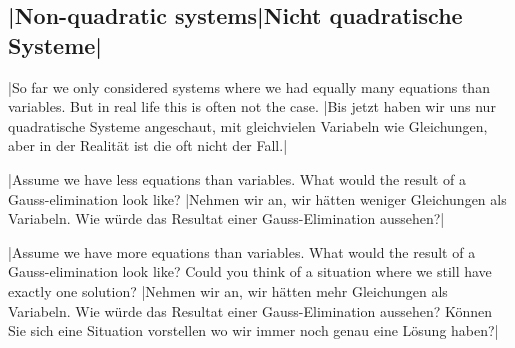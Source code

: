 \begin{exer}
\begin{itemize}
\end{itemize}
\end{exer}




\newpage

\subsection{\tr|Non-quadratic systems|Nicht quadratische Systeme|}
\tr|So far we only considered systems where we had equally many equations than variables. But in real life this is often not the case.
   |Bis jetzt haben wir uns nur quadratische Systeme angeschaut, mit gleichvielen Variabeln wie Gleichungen, aber in der Realität ist die oft nicht der Fall.|  
\begin{exer}
 \tr|Assume we have less equations than variables. What would the result of a Gauss-elimination look like?
    |Nehmen wir an, wir hätten weniger Gleichungen als Variabeln. Wie würde das Resultat einer Gauss-Elimination aussehen?|
\end{exer}
\vfill
\begin{exer}
 \tr|Assume we have more equations than variables. What would the result of a Gauss-elimination look like? Could you think of a situation where we still have exactly one solution?
    |Nehmen wir an, wir hätten mehr Gleichungen als Variabeln. Wie würde das Resultat einer Gauss-Elimination aussehen? Können Sie sich eine Situation vorstellen wo wir immer noch genau eine Lösung haben?|
\end{exer}
\vfill
